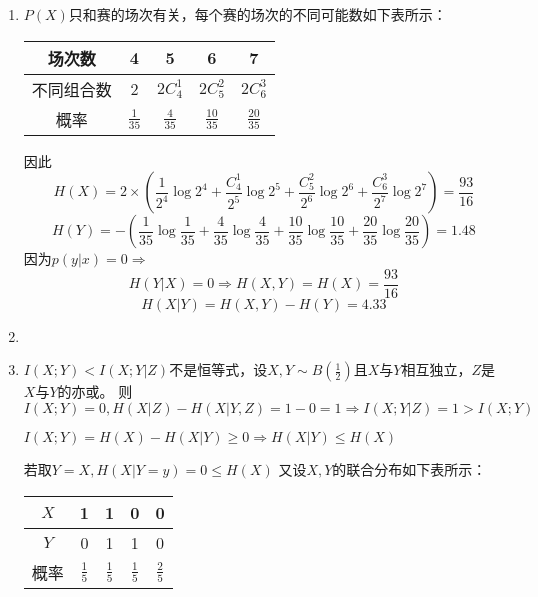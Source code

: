 \documentclass{article}
\begin{document}
\begin{enumerate}
\item
$P(X)$只和赛的场次有关，每个赛的场次的不同可能数如下表所示：
\begin{table}[!ht]
\centering
\begin{tabular}{|c|c|c|c|c|}
\hline
场次数 & 4 & 5 & 6 & 7 \\
\hline
不同组合数 & 2 & $2C^1_4$ & $2C^2_5$ & $2C^3_6$ \\
\hline
概率 & $\frac{1}{35}$ & $\frac{4}{35}$ & $\frac{10}{35}$ & $\frac{20}{35}$ \\
\hline
\end{tabular}
\end{table}

因此
$$
H(X) = 2 \times(\frac{1}{2^4} \log 2^4 +\frac{C^1_4}{2^5}\log 2^5 +\frac{C^2_5}{2^6}\log 2^6 +\frac{C^3_6}{2^7}\log 2^7) = \frac{93}{16}
$$
$$
H(Y) = -(\frac{1}{35}\log \frac{1}{35} + \frac{4}{35} \log \frac{4}{35} + \frac{10}{35} \log \frac{10}{35} + \frac{20}{35} \log \frac{20}{35})=1.48
$$
因为$p(y|x)=0\Rightarrow$
$$
H(Y|X)=0\Rightarrow H(X,Y)=H(X)=\frac{93}{16}
$$
$$
H(X|Y)=H(X,Y)-H(Y)=4.33
$$
\item 
\item 
$I(X;Y)<I(X;Y|Z)$不是恒等式，设$X,Y\sim B(\frac{1}{2})$且$X$与$Y$相互独立，$Z$是$X$与$Y$的亦或。
则$I(X;Y)=0,H(X|Z)-H(X|Y,Z)=1-0=1\Rightarrow I(X;Y|Z)=1>I(X;Y)$

$I(X;Y)=H(X)-H(X|Y)\geq 0\Rightarrow H(X|Y)\leq H(X)$

若取$Y=X,H(X|Y=y)=0 \leq H(X)$
又设$X,Y$的联合分布如下表所示：

\begin{table}[!ht]
\centering
\begin{tabular}{|c|c|c|c|c|}
\hline
 $X$ & 1 & 1 & 0 & 0 \\
\hline
 $Y$ & 0 & 1 & 1 & 0 \\
\hline
概率 & $\frac{1}{5}$ & $\frac{1}{5}$ & $\frac{1}{5}$ & $\frac{2}{5}$ \\
\hline
\end{tabular}
\end{table}


\end{enumerate}
\end{document}

